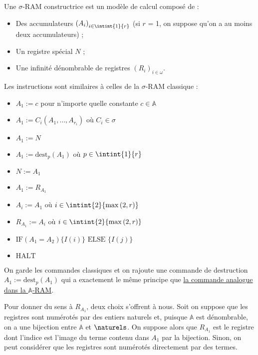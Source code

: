 \documentclass{report}
\newcommand{\sRAMifc}[2]{\text{IF} (A_1=A_2) \{I( #1 )\} \text{ ELSE } \{I( #2 )\}}
\newcommand{\bbA}{\mathbb{A}}
\begin{document}
				\begin{definition}
					\label{def:sigma_RAM_constructrice}
					Une $\sigma$-RAM constructrice est un modèle de calcul composé de :
					
					\begin{itemize}[itemsep=-1mm]
						\item	Des accumulateurs $\left(A_i\right)_{i\in \intint{1}{r}}$ (si $r$ = 1, on suppose qu'on a au moins deux accumulateurs) ;
						\item 	Un registre spécial $N$ ;
						\item 	Une infinité dénombrable de registres $\left( R_i\right)_{i \in \omega}$.
					\end{itemize}
				
					
					Les instructions sont similaires à celles de la $\sigma$-RAM classique :
					
					\begin{itemize}[itemsep=-1mm]
						\item 	$A_1 := c$ pour n'importe quelle constante $c \in \bbA$
						\item 	$A_1 := C_i(A_1, \dots, A_{r_i})$ où $C_i \in \sigma$
						\item 	$A_1 := N$
						\item 	$A_1 := \text{dest}_p(A_1)$ où $p \in \intint{1}{r}$
						\item 	$N := A_1$
						\item 	$A_1 := R_{A_1}$
						\item 	$A_i := A_1$ où $i \in \intint{2}{\max\left( 2, r \right)}$
						\item 	$R_{A_1} := A_i$ où $i \in \intint{2}{\max\left( 2, r \right)}$
						\item 	$\sRAMifc{i}{j}$
						\item 	$\text{HALT}$
					\end{itemize}
					
					On garde les commandes classiques et on rajoute une commande de destruction $A_1 := \text{dest}_p(A_1)$ qui a exactement le même principe que \hyperref[def:A_RAM]{la commande analogue dans la $\bbA$-RAM}.
				\end{definition}
				
				Pour donner du sens à $R_{A_1}$, deux choix s'offrent à nous. Soit on suppose que les registres sont numérotés par des entiers naturels et, puisque $\bbA$ est dénombrable, on a une bijection entre $\bbA$ et $\naturels$. On suppose alors que $R_{A_1}$ est le registre dont l'indice est l'image du terme contenu dans $A_1$ par la bijection. Sinon, on peut considérer que les registres sont numérotés directement par des termes.
				
\end{document}
